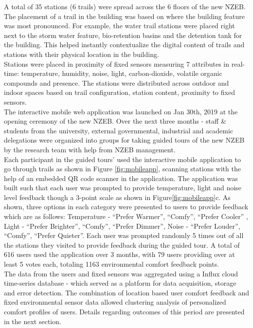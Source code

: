 

A total of 35 stations (6 trails) were spread across the 6 floors of the new NZEB. The placement of a trail in the building was based on where the building feature was most pronounced. For example, the water trail stations were placed right next to the storm water feature, bio-retention basins and the detention tank for the building. This helped instantly contextualize the digital content of trails and stations with their physical location in the building.\\

Stations were placed in proximity of fixed sensors measuring 7 attributes in real-time: temperature, humidity, noise, light, carbon-dioxide, volatile organic compounds and presence. The stations were distributed across outdoor and indoor spaces based on trail configuration, station content, proximity to fixed sensors.\\

The interactive mobile web application was launched on Jan 30th, 2019 at the opening ceremony of the new NZEB. Over the next three months - staff \& students from the university, external governmental, industrial and academic delegations were organized into groups for taking guided tours of the new NZEB by the research team with help from NZEB management.\\

Each participant in the guided tours' used the interactive mobile application to go through trails as shown in Figure \ref{fig:mobileapp}, scanning stations with the help of an embedded QR code scanner in the application. The application was built such that each user was prompted to provide temperature, light and noise level feedback though a 3-point scale as shown in Figure\ref{fig:mobileapp}c. As shown, three options in each category were presented to users to provide feedback which are as follows: Temperature - ``Prefer Warmer'', ``Comfy'', ``Prefer Cooler'' , Light - ``Prefer Brighter'', ``Comfy'', ``Prefer Dimmer'', Noise - ``Prefer Louder'', ``Comfy'', ``Prefer Quieter''.  
Each user was prompted randomly 5 times out of all the stations they visited to provide feedback during the guided tour. A total of 616 users used the application over 3 months, with 79 users providing over at least 5 votes each, totaling 1163 environmental comfort feedback points.\\

The data from the users and fixed sensors was aggregated using a Influx cloud time-series database - which served as a platform for data acquisition, storage and error detection. The combination of location based user comfort feedback and fixed environmental sensor data allowed clustering analysis of personalized comfort profiles of users. Details regarding outcomes of this period are presented in the next section.



